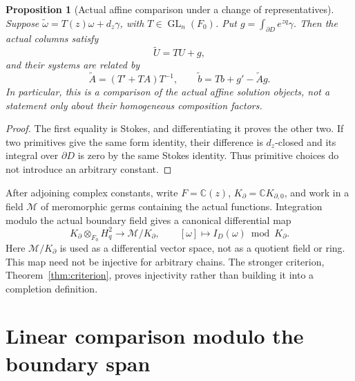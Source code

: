 \documentclass[11pt]{article}
\numberwithin{equation}{section}
\newtheorem{proposition}[proposition]{Proposition}
\theoremstyle{definition}
\theoremstyle{remark}
\newcommand{\C}{\mathbb C}
\newcommand{\GL}{\operatorname{GL}}
\newcommand{\Hq}{H_q^2}
\newcommand{\M}{\mathscr M}
\begin{document}
\begin{proposition}[Actual affine comparison under a change of representatives]
\label{prop:gauge}
Suppose
$\widetilde\omega=T(z)\omega+d_z\gamma$, with $T\in\GL_n(F_0)$.
Put $g=\int_{\partial D}e^{zq}\gamma$. Then the actual columns satisfy
\[
 \widetilde U=TU+g,
\]
and their systems are related by
\[
 \widetilde A=(T'+TA)T^{-1},\qquad
 \widetilde b=Tb+g'-\widetilde A g.
\]
In particular, this is a comparison of the actual affine solution objects,
not a statement only about their homogeneous composition factors.
\end{proposition}
\begin{proof}
The first equality is Stokes, and differentiating it proves the other two.
If two primitives give the same form identity, their difference is
$d_z$-closed and its integral over $\partial D$ is zero by the same Stokes
identity. Thus primitive choices do not introduce an arbitrary constant.
\end{proof}

After adjoining complex constants, write $F=\C(z)$,
$K_\partial=\C K_{\partial,0}$, and work in a field $\M$ of meromorphic
germs containing the actual functions. Integration modulo the actual
boundary field gives a canonical differential map
\begin{equation}\label{eq:canonical-comparison}
 K_\partial\otimes_{F_0}\Hq\longrightarrow\M/K_\partial,
 \qquad [\omega]\longmapsto I_D(\omega)\bmod K_\partial.
\end{equation}
Here $\M/K_\partial$ is used as a differential vector space, not as a
quotient field or ring. This map need not be injective for arbitrary chains.
The stronger criterion, Theorem~\ref{thm:criterion}, proves injectivity rather than building it into a
completion definition.

\section{Linear comparison modulo the boundary span}\label{sec:linear}
\end{document}
